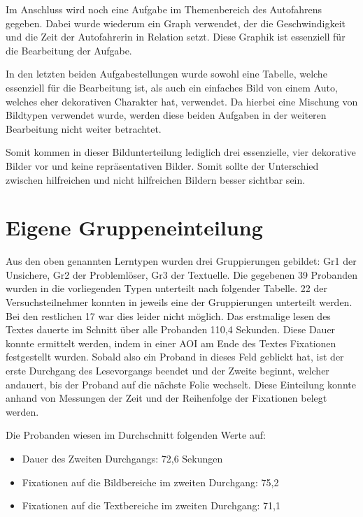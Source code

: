Im Anschluss wird noch eine Aufgabe im Themenbereich des Autofahrens gegeben. Dabei wurde wiederum ein Graph verwendet, der die Geschwindigkeit und die Zeit der Autofahrerin in Relation setzt. Diese Graphik ist essenziell für die Bearbeitung der Aufgabe. 


In den letzten beiden Aufgabestellungen wurde sowohl eine Tabelle, welche essenziell für die Bearbeitung ist, als auch ein einfaches Bild von einem Auto, welches eher dekorativen Charakter hat, verwendet. Da hierbei eine Mischung von Bildtypen verwendet wurde, werden diese beiden Aufgaben in der weiteren Bearbeitung nicht weiter betrachtet. 

Somit kommen in dieser Bildunterteilung lediglich drei essenzielle, vier dekorative Bilder vor und keine repräsentativen Bilder. Somit sollte der Unterschied zwischen hilfreichen und nicht hilfreichen Bildern besser sichtbar sein.


\section{Eigene Gruppeneinteilung}

Aus den oben genannten Lerntypen wurden drei Gruppierungen gebildet: \gls{Gr1} der Unsichere, \gls{Gr2} der Problemlöser, \gls{Gr3} der Textuelle. Die gegebenen 39 Probanden wurden in die vorliegenden Typen unterteilt nach folgender Tabelle. 22 der Versuchsteilnehmer konnten in jeweils eine der Gruppierungen unterteilt werden. Bei den restlichen 17 war dies leider nicht möglich. Das erstmalige lesen des Textes dauerte im Schnitt über alle Probanden 110,4 Sekunden. Diese Dauer konnte ermittelt werden, indem in einer AOI am Ende des Textes Fixationen festgestellt wurden. Sobald also ein Proband in dieses Feld geblickt hat, ist der erste Durchgang des Lesevorgangs beendet und der Zweite beginnt, welcher andauert, bis der Proband auf die nächste Folie wechselt. Diese Einteilung konnte anhand von Messungen der Zeit und der Reihenfolge der Fixationen belegt werden. 


Die Probanden wiesen im Durchschnitt folgenden Werte auf:
    \begin{itemize}
        \item Dauer des Zweiten Durchgangs: 72,6 Sekungen 
        \item Fixationen auf die Bildbereiche im zweiten Durchgang: 75,2
        \item Fixationen auf die Textbereiche im zweiten Durchgang: 71,1
    \end{itemize}

